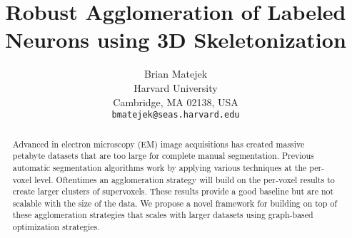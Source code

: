 \documentclass[10pt,twocolumn,letterpaper]{article}
\begin{document}
\title{Robust Agglomeration of Labeled Neurons using 3D Skeletonization}

\author{Brian Matejek\\
Harvard University\\
Cambridge, MA 02138, USA\\
{\tt\small bmatejek@seas.harvard.edu}
}

\maketitle

\begin{abstract}
Advanced in electron microscopy (EM) image acquisitions has created massive petabyte datasets that are too large for complete manual segmentation. Previous automatic segmentation algorithms work by applying various techniques at the per-voxel level. Oftentimes an agglomeration strategy will build on the per-voxel results to create larger clusters of supervoxels. These results provide a good baseline but are not scalable with the size of the data. We propose a novel framework for building on top of these agglomeration strategies that scales with larger datasets using graph-based optimization strategies. 
\end{abstract}














{\small

}
\end{document}
